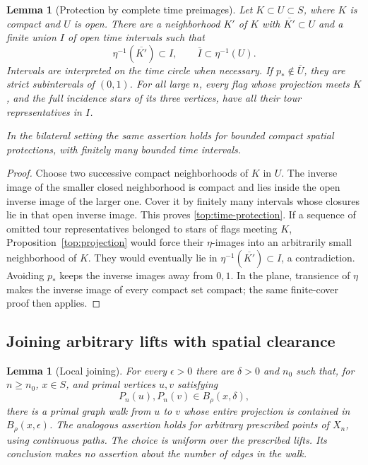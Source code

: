 \documentclass[11pt]{article}
\numberwithin{equation}{section}
\newtheorem{lemma}[theorem]{Lemma}
\theoremstyle{definition}
\theoremstyle{remark}
\newcommand{\1}{\mathbf 1}
\begin{document}
\begin{lemma}[Protection by complete time preimages]
\label{top:protection}
Let $K\subset U\subset S$, where $K$ is compact and $U$ is open.
There are a neighborhood $K'$ of $K$ with $\overline{K'}\subset U$ and a
finite union $I$ of open time intervals such that
\begin{equation}\label{top:time-protection}
 \eta^{-1}(\overline{K'})\subset I,
 \qquad \overline I\subset\eta^{-1}(U).
\end{equation}
Intervals are interpreted on the time circle when necessary.  If
$p_*\notin\overline U$, they are strict subintervals of $(0,1)$.
For all large $n$, every flag whose projection meets $K$, and the full
incidence stars of its three vertices, have all their tour
representatives in $I$.

In the bilateral setting the same assertion holds for bounded compact
spatial protections, with finitely many bounded time intervals.
\end{lemma}

\begin{proof}
Choose two successive compact neighborhoods of $K$ in $U$.
The inverse image of the smaller closed neighborhood is compact and
lies inside the open inverse image of the larger one.  Cover it by
finitely many intervals whose closures lie in that open inverse image.
This proves \eqref{top:time-protection}.  If a sequence of omitted tour
representatives belonged to stars of flags meeting $K$,
Proposition~\ref{top:projection} would force their $\eta$-images into
an arbitrarily small neighborhood of $K$.  They would eventually lie
in $\eta^{-1}(\overline{K'})\subset I$, a contradiction.  Avoiding
$p_*$ keeps the inverse images away from $0,1$.
In the plane, transience of $\eta$ makes the inverse image of every
compact set compact; the same finite-cover proof then applies.
\end{proof}

\subsection{Joining arbitrary lifts with spatial clearance}

\begin{lemma}[Local joining]\label{top:local-joining}
For every $\epsilon>0$ there are $\delta>0$ and $n_0$ such that, for
$n\ge n_0$, $x\in S$, and primal vertices $u,v$ satisfying
\[
 P_n(u),P_n(v)\in B_\rho(x,\delta),
\]
there is a primal graph walk from $u$ to $v$ whose entire projection is
contained in $B_\rho(x,\epsilon)$.
The analogous assertion holds for arbitrary prescribed points of
$X_n$, using continuous paths.  The choice is uniform over the
prescribed lifts.  Its conclusion makes no assertion about the number
of edges in the walk.
\end{lemma}
\end{document}
